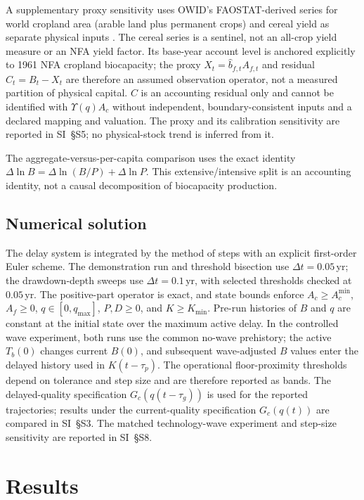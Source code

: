 \documentclass[preprint,12pt,authoryear]{elsarticle}
\newcommand{\Acmin}{A_c^{\min}}
\begin{document}
A supplementary proxy sensitivity uses OWID's FAOSTAT-derived series for world cropland area (arable land plus permanent crops) and cereal yield as separate physical inputs \citep{OWIDCropland2026,OWIDCereal2026}. The cereal series is a sentinel, not an all-crop yield measure or an NFA yield factor. Its base-year account level is anchored explicitly to 1961 NFA cropland biocapacity; the proxy $X_t=\hat b_{f,t}A_{f,t}$ and residual $C_t=B_t-X_t$ are therefore an assumed observation operator, not a measured partition of physical capital. $C$ is an accounting residual only and cannot be identified with $\Upsilon(q)A_c$ without independent, boundary-consistent inputs and a declared mapping and valuation. The proxy and its calibration sensitivity are reported in SI~\S S5; no physical-stock trend is inferred from it.

The aggregate-versus-per-capita comparison uses the exact identity $\Delta\ln B=\Delta\ln(B/P)+\Delta\ln P$. This extensive/intensive split is an accounting identity, not a causal decomposition of biocapacity production.

\subsection{Numerical solution}\label{sec:numerics}

The delay system is integrated by the method of steps with an explicit first-order Euler scheme. The demonstration run and threshold bisection use $\Delta t=0.05$\,yr; the drawdown-depth sweeps use $\Delta t=0.1$\,yr, with selected thresholds checked at $0.05$\,yr. The positive-part operator is exact, and state bounds enforce $A_c\ge\Acmin$, $A_f\ge0$, $q\in[0,q_{\max}]$, $P,D\ge0$, and $K\ge K_{\min}$. Pre-run histories of $B$ and $q$ are constant at the initial state over the maximum active delay. In the controlled wave experiment, both runs use the common no-wave prehistory; the active $T_b(0)$ changes current $B(0)$, and subsequent wave-adjusted $B$ values enter the delayed history used in $K(t-\tau_p)$. The operational floor-proximity thresholds depend on tolerance and step size and are therefore reported as bands. The delayed-quality specification $G_c(q(t-\tau_g))$ is used for the reported trajectories; results under the current-quality specification $G_c(q(t))$ are compared in SI~\S S3. The matched technology-wave experiment and step-size sensitivity are reported in SI~\S S8.
\section{Results}\label{sec:results}
\end{document}
